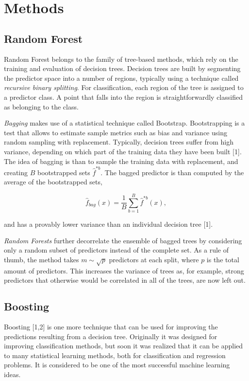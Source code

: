 \documentclass{article}
\begin{document}
\section{Methods}

\subsection{Random Forest}

Random Forest belongs to the family of tree-based methods, which rely on the training and evaluation of decision trees.
Decision trees are built by segmenting the predictor space into a number of regions, typically using a technique called \textit{recursive binary splitting}.
For classification, each region of the tree is assigned to a predictor class.
A point that falls into the region is straightforwardly classified as belonging to the class.

\textit{Bagging} makes use of a statistical technique called Bootstrap. 
Bootstrapping is a test that allows to estimate sample metrics such as bias and variance using random sampling with replacement.
Typically, decision trees suffer from high variance, depending on which part of the training data they have been built [1].
The idea of bagging is than to sample the training data with replacement, and creating $B$ bootstrapped sets $\hat{f}^{*b}$. 
The bagged predictor is than computed by the average of the bootstrapped sets,

\begin{equation} \label{boost_error_rate}
\hat{f}_{bag}(x)=\frac{1}{B}\sum_{b=1}^{B}\hat{f}^{*b}(x),
\end{equation}

and has a provably lower variance than an individual decision tree [1].

\textit{Random Forests} further decorrelate the ensemble of bagged trees by considering only a random subset of predictors instead of the complete set. As a rule of thumb, the method takes $m \sim  \sqrt{p}$ predictors at each split, where $p$ is the total amount of predictors. This increases the variance of trees as, for example, strong predictors that otherwise would be correlated in all of the trees, are now left out. 

\subsection{Boosting}

Boosting [1,2] is one more technique that can be used for improving the predictions resulting from a decision tree. Originally it was designed for improving classification methods, but soon it was realized that it can be applied to many statistical learning methods, both for classification and regression problems. It is considered to be one of the most successful machine learning ideas.
\end{document}
